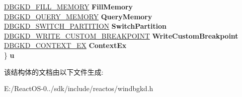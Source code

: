 \begin{DoxyCompactItemize}
\begin{tabbing}
\>\hyperlink{struct___d_b_g_k_d___f_i_l_l___m_e_m_o_r_y}{DBGKD\_FILL\_MEMORY} {\bfseries FillMemory}\\
\>\hyperlink{struct___d_b_g_k_d___q_u_e_r_y___m_e_m_o_r_y}{DBGKD\_QUERY\_MEMORY} {\bfseries QueryMemory}\\
\>\hyperlink{struct___d_b_g_k_d___s_w_i_t_c_h___p_a_r_t_i_t_i_o_n}{DBGKD\_SWITCH\_PARTITION} {\bfseries SwitchPartition}\\
\>\hyperlink{struct___d_b_g_k_d___w_r_i_t_e___c_u_s_t_o_m___b_r_e_a_k_p_o_i_n_t}{DBGKD\_WRITE\_CUSTOM\_BREAKPOINT} {\bfseries WriteCustomBreakpoint}\\
\>\hyperlink{struct___d_b_g_k_d___c_o_n_t_e_x_t___e_x}{DBGKD\_CONTEXT\_EX} {\bfseries ContextEx}\\
\} {\bfseries u}\\

\end{tabbing}\end{DoxyCompactItemize}


该结构体的文档由以下文件生成\+:\begin{DoxyCompactItemize}
\item 
E\+:/\+React\+O\+S-\/0../sdk/include/reactos/windbgkd.\+h\end{DoxyCompactItemize}
